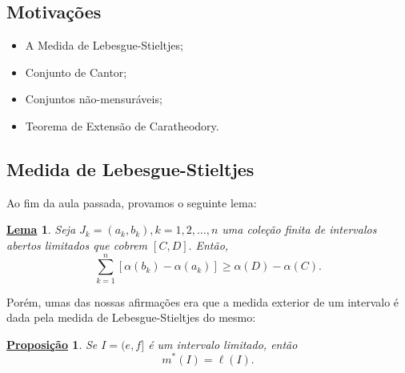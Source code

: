 \documentclass{article}
\newtheorem*{lemma*}{\underline{Lema}}
\newtheorem*{prop*}{\underline{Proposi\c c\~ao}}
\begin{document}
\subsection{Motivações}
\begin{itemize}
	\item A Medida de Lebesgue-Stieltjes;
	\item Conjunto de Cantor;
	\item Conjuntos não-mensuráveis;
	\item Teorema de Extensão de Caratheodory.
\end{itemize}
\subsection{Medida de Lebesgue-Stieltjes}
Ao fim da aula passada, provamos o seguinte lema:
\begin{lemma*}
	Seja \(J_{k} = (a_{k}, b_{k}), k = 1, 2, \dotsc , n\) uma coleção finita de intervalos abertos limitados que cobrem \([C, D].\) Então,
	\[
		\sum\limits_{k=1}^{n}[\alpha (b_{k}) - \alpha (a_{k})] \geq \alpha (D) - \alpha (C).
	\]
\end{lemma*}
Porém, umas das nossas afirmações era que a medida exterior de um intervalo é dada pela medida de Lebesgue-Stieltjes do mesmo:
\begin{prop*}
	Se \(I = (e, f]\) é um intervalo limitado, então
	\[
		m^{*}(I) = \ell (I).
	\]
\end{prop*}
\end{document}
